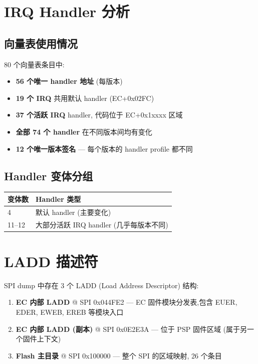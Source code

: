 \documentclass[a4paper,11pt,fontset=none]{ctexart}
\begin{document}
\section{IRQ Handler 分析}

\subsection{向量表使用情况}

80 个向量表条目中:
\begin{itemize}[nosep]
  \item \textbf{56 个唯一 handler 地址} (每版本)
  \item \textbf{19 个 IRQ} 共用默认 handler (EC+0x02FC)
  \item \textbf{37 个活跃 IRQ} handler, 代码位于 EC+0x1xxxx 区域
  \item \textbf{全部 74 个 handler} 在不同版本间均有变化
  \item \textbf{12 个唯一版本签名} — 每个版本的 handler profile 都不同
\end{itemize}

\subsection{Handler 变体分组}

\begin{center}
\begin{tabular}{l l}
  \toprule
  \textbf{变体数} & \textbf{Handler 类型} \\
  \midrule
  4 & 默认 handler (主要变化) \\
  11--12 & 大部分活跃 IRQ handler (几乎每版本不同) \\
  \bottomrule
\end{tabular}
\end{center}

\section{LADD 描述符}

SPI dump 中存在 3 个 LADD (Load Address Descriptor) 结构:

\begin{enumerate}[nosep]
  \item \textbf{EC 内部 LADD} @ SPI 0x044FE2 — EC 固件模块分发表,包含 EUER, EDER, EWEB, EREB 等模块入口
  \item \textbf{EC 内部 LADD (副本)} @ SPI 0x0E2E3A — 位于 PSP 固件区域 (属于另一个固件上下文)
  \item \textbf{Flash 主目录} @ SPI 0x100000 — 整个 SPI 的区域映射, 26 个条目
\end{enumerate}
\end{document}
